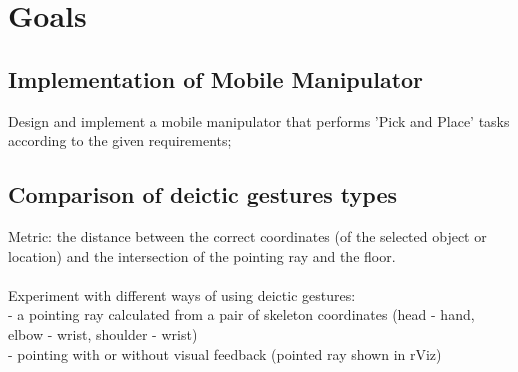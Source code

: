 \section{Goals}
\subsection{Implementation of Mobile Manipulator}
Design and implement a mobile manipulator that performs 'Pick and Place' tasks according to the given requirements;
\subsection{Comparison of deictic gestures types}
Metric: the distance between the correct coordinates (of the selected object or location) and the intersection of the pointing ray and the floor.\\ \\
Experiment with different ways of using deictic gestures:\\
- a pointing ray calculated from a pair of skeleton coordinates (head - hand, elbow - wrist, shoulder - wrist)\\
- pointing with or without visual feedback (pointed ray shown in rViz)\\


